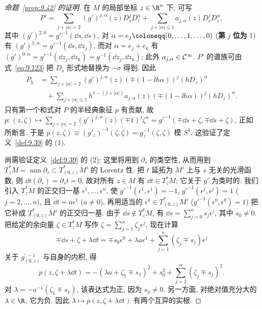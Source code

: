 \begin{proof}[命题~\ref{prop:9.42} 的证明]
在 $M$ 的局部坐标 $z \in \R^n$ 下, 可写
\begin{equation}\label{eq:9.123}
    P' = \sum_{j+|\alpha| = 2} (g')^{j,\alpha}(z) D_s^j D_z^\alpha + \sum_{j+|\alpha| \le 1} a_{j,\alpha}(z) D_s^j D_z^\alpha,
\end{equation}
其中 $(g')^{2,0} = g'^{-1}(\dd s, \dd s)$, 对 $\alpha = e_j \defeq (0, \ldots, 1, \ldots, 0)$ (\textbf{第} $j$ \textbf{位为} $1$) 有 $(g')^{1,\alpha} = g'^{-1}(\dd s, \dd z_j)$, 而对 $\alpha = e_j + e_k$ 有 $(g')^{0,\alpha} = g'^{-1}(\dd z_j, \dd z_k) = g^{-1}(\dd z_j, \dd z_k)$; 此外 $a_{j,\alpha} \in \mathcal{C}^\infty$. $P'$ 的谱族可由式~\eqref{eq:9.123} 把 $D_s$ 形式地替换为 $-\sigma$ 得到. 因此
\begin{equation}\label{eq:9.124}
    \begin{aligned}
        P_h &= \sum_{j+|\alpha| = 2} (g')^{j,\alpha}(z) \left( \mp (1 - \ii h \alpha) \right)^j (h D_z)^\alpha \\
        &\quad + \sum_{j+|\alpha| \le 1} h^{1-(j+|\alpha|)} a_{j,\alpha}(z) \left( \mp (1 - \ii h \alpha) \right)^j (h D_z)^\alpha.
    \end{aligned}
\end{equation}
只有第一个和式对 $P$ 的半经典象征 $p$ 有贡献, 故 $p \colon (z, \zeta) \mapsto \sum_{j+|\alpha|=2} (g')^{j,\alpha}(z) (\mp 1)^j \zeta^\alpha = g'^{-1}(\mp \dd s + \zeta, \mp \dd s + \zeta)$, 正如所断言. 于是 $p(z, \zeta) \equiv (g'_z)^{-1}(\zeta, \zeta) = g_z^{-1}(\zeta, \zeta)$ 模 $S^1$, 这验证了定义~\ref{def:9.39} 的 (1).

尚需验证定义~\ref{def:9.39} 的 (2); 这里将用到 $\partial_s$ 的类空性, 从而用到 $T_z^* M = \operatorname{ann} \partial_s \subset T_{(0,z)}^* M'$ 的 Lorentz 性. 把 $t$ 延拓为 $M'$ 上与 $s$ 无关的光滑函数, 则 $\dd t(\partial_s) = \partial_s t = 0$, 故对所有 $z \in M$ 有 $\dd t \in T_z^* M$; 它关于 $g'$ 为类时的. 我们引入 $T_z^* M$ 的正交归一基 $\epsilon^1, \ldots, \epsilon^n$, 使 $g'^{-1}(\epsilon^1, \epsilon^1) = -1$, $g'^{-1}(\epsilon^j, \epsilon^j) = 1$ ($j = 2, \ldots, n$), 且 $\dd t = a \epsilon^1$ ($a \neq 0$), 再用适当的 $\epsilon^0 \in T_{(0,z)}^* M'$ ($g'^{-1}(\epsilon^0, \epsilon^0) = 1$) 把它补成 $T_{(0,z)}^* M'$ 的正交归一基. 由于 $\dd s \notin T_z^* M$, 有 $\dd s = \sum_{j=0}^{n} s_j \epsilon^j$, 其中 $s_0 \neq 0$. 把给定的余向量 $\zeta \in T_z^* M$ 写作 $\zeta = \sum_{j=1}^{n} \zeta_j \epsilon^j$, 现在计算
\begin{equation}\label{eq:9.125}
    \mp \dd s + \zeta + \lambda \dd t = \mp s_0 \epsilon^0 + \lambda a \epsilon^1 + \sum_{j=1}^{n} (\zeta_j \mp s_j) \epsilon^j
\end{equation}
关于 $g_{(0,z)}^{'\,-1}$ 与自身的内积, 得
\begin{equation}\label{eq:9.126}
    p(z, \zeta + \lambda \dd t) = -(\lambda a + \zeta_1 \mp s_1)^2 + s_0^2 + \sum_{j=2}^{n} (\zeta_j \mp s_j)^2.
\end{equation}
对 $\lambda = -a^{-1}(\zeta_1 \mp s_1)$, 该表达式为正, 因为 $s_0 \neq 0$. 另一方面, 对绝对值充分大的 $\lambda \in \R$, 它为负. 因此 $\lambda \mapsto p(z, \zeta + \lambda \dd t)$ 有两个互异的实根.
\end{proof}

